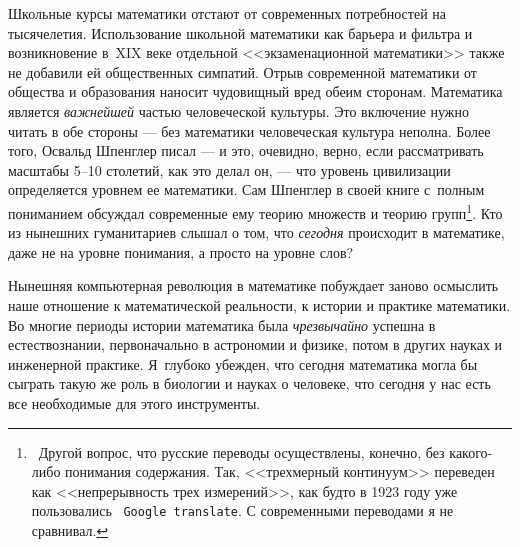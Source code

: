 \documentclass[intlimits,twoside,a4paper,11pt]{article}
\begin{document}
	Школьные курсы математики отстают от современных потребностей на
	тысячелетия. Использование школьной математики как барьера и фильтра
	и возникновение в~XIX веке отдельной <<экзаменационной математики>>
	также не добавили ей общественных симпатий. Отрыв современной математики 
	от общества и образования наносит чудовищный вред обеим сторонам. 
	Математика является {\it важнейшей\/} частью человеческой культуры. Это включение
	нужно читать в обе стороны --- без математики человеческая культура неполна.
	Более того, Освальд Шпенглер писал --- и это, очевидно,
	верно, если рассматривать масштабы 5--10 столетий, как это делал он, --- 
	что уровень цивилизации определяется уровнем ее математики. Сам
	Шпенглер в своей книге с~полным пониманием обсуждал современные ему теорию 
	множеств и теорию групп\footnote{~Другой вопрос, что русские переводы
		осуществлены, конечно, без какого-либо понимания содержания. Так, 
		<<трехмерный континуум>>
		переведен как <<непрерывность трех измерений>>, как будто в 1923
		году уже пользовались \ {\tt Google translate}. С современными переводами я не
		сравнивал.}. Кто из нынешних 
	гуманитариев слышал о том, что {\it сегодня\/} происходит в математике, даже
	не на уровне понимания, а просто на уровне слов?
	
	Нынешняя компьютерная революция в математике побуждает 
	заново осмыслить наше отношение к математической реальности, к
	истории и практике математики. Во многие периоды истории математика была 
	{\it чрезвычайно\/} успешна в естествознании, первоначально в астрономии и 
	физике, потом в других науках и инженерной практике. 
	Я~глубоко убежден, 
	что сегодня математика могла бы сыграть такую же роль в биологии и науках 
	о человеке, что сегодня у нас есть все необходимые для этого инструменты.
	
\end{document}

